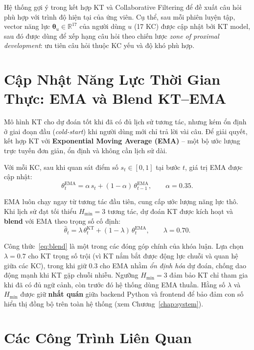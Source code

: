 Hệ thống gợi ý trong \system{} kết hợp KT và Collaborative Filtering để đề xuất câu hỏi phù hợp với trình độ hiện tại của ứng viên. Cụ thể, sau mỗi phiên luyện tập, vector năng lực $\bm{\theta}_u \in \mathbb{R}^{17}$ của người dùng $u$ (17 KC) được cập nhật bởi KT model, sau đó được dùng để xếp hạng câu hỏi theo chiến lược \textit{zone of proximal development}: ưu tiên câu hỏi thuộc KC yếu và độ khó phù hợp.

\section{Cập Nhật Năng Lực Thời Gian Thực: EMA và Blend KT--EMA}
\label{sec:ema}

Mô hình KT cho dự đoán tốt khi đã có đủ lịch sử tương tác, nhưng kém ổn định ở giai đoạn đầu (\textit{cold-start}) khi người dùng mới chỉ trả lời vài câu. Để giải quyết, \system{} kết hợp KT với \textbf{Exponential Moving Average (EMA)} -- một bộ ước lượng trực tuyến đơn giản, ổn định và không cần lịch sử dài.

Với mỗi KC, sau khi quan sát điểm số $s_t \in [0,1]$ tại bước $t$, giá trị EMA được cập nhật:
\begin{equation}
  \theta^{\text{EMA}}_t = \alpha \, s_t + (1 - \alpha)\,\theta^{\text{EMA}}_{t-1},
  \qquad \alpha = 0.35 .
\end{equation}

EMA luôn chạy ngay từ tương tác đầu tiên, cung cấp ước lượng năng lực thô. Khi lịch sử đạt tối thiểu $H_{\min} = 3$ tương tác, dự đoán KT được kích hoạt và \textbf{blend} với EMA theo trọng số cố định:
\begin{equation}
  \hat{\theta}_t = \lambda \, \theta^{\text{KT}}_t + (1 - \lambda)\,\theta^{\text{EMA}}_t,
  \qquad \lambda = 0.70 .
  \label{eq:blend}
\end{equation}

Công thức~\eqref{eq:blend} là một trong các đóng góp chính của khóa luận. Lựa chọn $\lambda = 0.7$ cho KT trọng số trội (vì KT nắm bắt được động lực chuỗi và quan hệ giữa các KC), trong khi giữ $0.3$ cho EMA nhằm \textit{ổn định hóa} dự đoán, chống dao động mạnh khi KT gặp chuỗi nhiễu. Ngưỡng $H_{\min}=3$ đảm bảo KT chỉ tham gia khi đã có đủ ngữ cảnh, còn trước đó hệ thống dùng EMA thuần. Hằng số $\lambda$ và $H_{\min}$ được giữ \textbf{nhất quán} giữa backend Python và frontend để bảo đảm con số hiển thị đồng bộ trên toàn hệ thống (xem Chương~\ref{chap:system}).

\section{Các Công Trình Liên Quan}
\label{sec:related}

